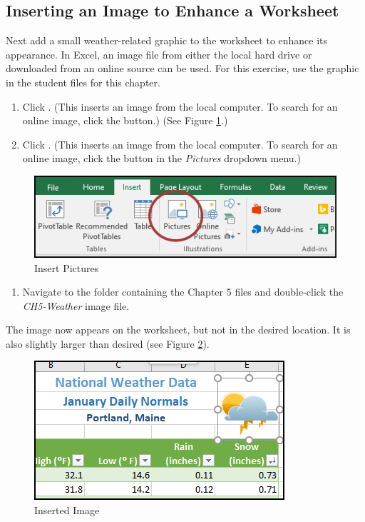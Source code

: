 \subsection{Inserting an Image to Enhance a Worksheet}

Next add a small weather-related graphic to the worksheet to enhance its appearance. In Excel, an image file from either the local hard drive or downloaded from an online source can be used. For this exercise, use the graphic in the student files for this chapter.

\begin{enumerate}
	\item {} Click . (This inserts an image from the local computer. To search for an online image, click the  button.) (See Figure \ref{05:fig28}.)
	\item {} Click . (This inserts an image from the local computer. To search for an online image, click the  button in the \textit{Pictures} dropdown menu.)
\end{enumerate}

\begin{figure}[H]
	\centering
	\includegraphics[width=\maxwidth{.95\linewidth}]{gfx/ch05_fig28}
	\caption{Insert Pictures}
	\label{05:fig28}
\end{figure}

\begin{enumerate}[resume]
	\item Navigate to the folder containing the Chapter $ 5 $ files and double-click the \textit{CH5-Weather} image file.
\end{enumerate}

The image now appears on the worksheet, but not in the desired location. It is also slightly larger than desired (see Figure \ref{05:fig29}).

\begin{figure}[H]
	\centering
	\includegraphics[width=\maxwidth{.95\linewidth}]{gfx/ch05_fig29}
	\caption{Inserted Image}
	\label{05:fig29}
\end{figure}

